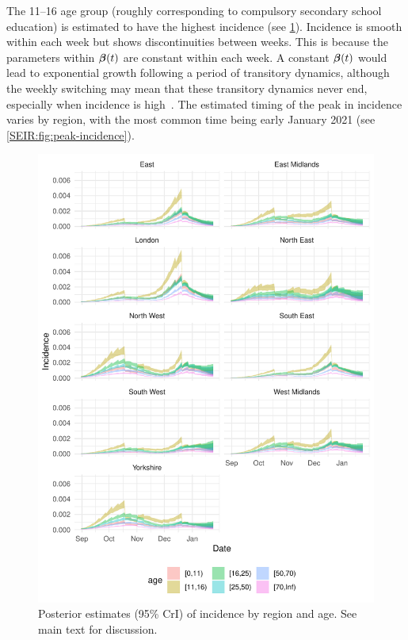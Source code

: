 \documentclass[thesis.tex]{subfiles}
\begin{document}
The 11--16 age group (roughly corresponding to compulsory secondary school education) is estimated to have the highest incidence (see \cref{SEIR:fig:incidence}).
Incidence is smooth within each week but shows discontinuities between weeks.
This is because the parameters within $\bm{\beta}(t)$ are constant within each week.
A constant $\bm{\beta}(t)$ would lead to exponential growth following a period of transitory dynamics, although the weekly switching may mean that these transitory dynamics never end, especially when incidence is high~\autocite{rhodesConvergence}.
The estimated timing of the peak in incidence varies by region, with the most common time being early January 2021 (see \cref{SEIR:fig:peak-incidence}).
\begin{figure}
    \includegraphics{SEIR/CIS/incidence}
    \caption[Posterior estimates of incidence]{%
        Posterior estimates (95\% CrI) of incidence by region and age.
        See main text for discussion.
    }
    \label{SEIR:fig:incidence}
\end{figure}
\end{document}
